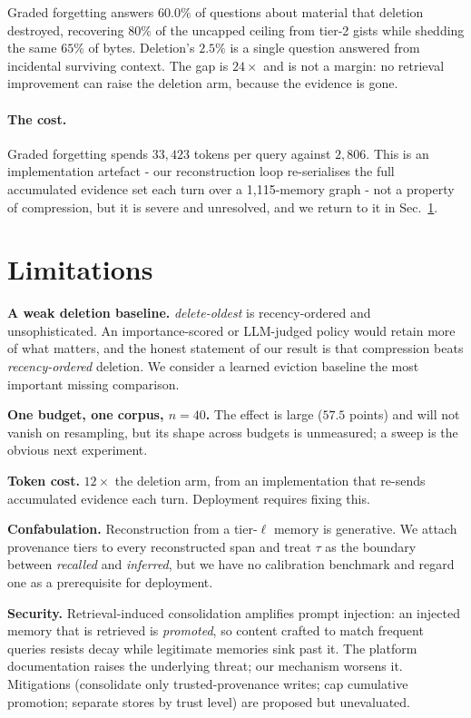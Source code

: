 \documentclass{article}
\theoremstyle{definition}\newtheorem{remark}{Remark}
\theoremstyle{plain}\newtheorem{proposition}{Proposition}
\begin{document}
Graded forgetting answers $60.0\%$ of questions about material that deletion
destroyed, recovering $80\%$ of the uncapped ceiling from tier-2 gists while
shedding the same $65\%$ of bytes. Deletion's $2.5\%$ is a single question
answered from incidental surviving context. The gap is $24\times$ and is not a
margin: no retrieval improvement can raise the deletion arm, because the
evidence is gone.


\paragraph{The cost.} Graded forgetting spends $33{,}423$ tokens per query
against $2{,}806$. This is an implementation artefact - our reconstruction
loop re-serialises the full accumulated evidence set each turn over a
1{,}115-memory graph - not a property of compression, but it is severe and
unresolved, and we return to it in Sec.~\ref{sec:limits}.

\section{Limitations}
\label{sec:limits}

\textbf{A weak deletion baseline.} \emph{delete-oldest} is recency-ordered and
unsophisticated. An importance-scored or LLM-judged policy would retain more of
what matters, and the honest statement of our result is that compression beats
\emph{recency-ordered} deletion. We consider a learned eviction baseline the
most important missing comparison.

\textbf{One budget, one corpus, $n{=}40$.} The effect is large ($57.5$ points)
and will not vanish on resampling, but its shape across budgets is unmeasured;
a sweep is the obvious next experiment.

\textbf{Token cost.} $12\times$ the deletion arm, from an implementation that
re-sends accumulated evidence each turn. Deployment requires fixing this.

\textbf{Confabulation.} Reconstruction from a tier-$\ell$ memory is generative.
We attach provenance tiers to every reconstructed span and treat $\tau$ as the
boundary between \emph{recalled} and \emph{inferred}, but we have no
calibration benchmark and regard one as a prerequisite for deployment.

\textbf{Security.} Retrieval-induced consolidation amplifies prompt injection:
an injected memory that is retrieved is \emph{promoted}, so content crafted to
match frequent queries resists decay while legitimate memories sink past it.
The platform documentation raises the underlying threat; our mechanism worsens
it. Mitigations (consolidate only trusted-provenance writes; cap cumulative
promotion; separate stores by trust level) are proposed but unevaluated.
\end{document}
